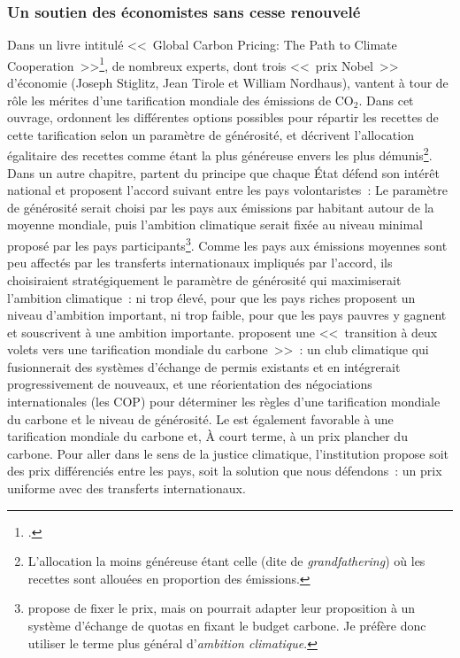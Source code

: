 \documentclass[a5paper,french,openany]{memoir}
\begin{document}
\subsubsection{Un soutien des économistes sans cesse renouvelé}
Dans un livre intitulé <<~Global Carbon Pricing: The Path to Climate Cooperation~>>\footnote{\citet{cramton_global_2017}.}, de nombreux experts, dont trois <<~prix Nobel~>> d'économie (Joseph Stiglitz, Jean Tirole et William Nordhaus), vantent à tour de rôle les mérites d'une tarification mondiale des émissions de CO$_\text{2}$. Dans cet ouvrage, \citet{gollier_negotiating_2015} ordonnent les différentes options possibles pour répartir les recettes de cette tarification selon un paramètre de générosité, et décrivent l'allocation égalitaire des recettes comme étant la plus généreuse envers les plus démunis\footnote{L'allocation la moins généreuse étant celle (dite de \textit{grandfathering}) où les recettes sont allouées en proportion des émissions.}. 
Dans un autre chapitre, \citet{cramton_international_2015} partent du principe que chaque État défend son intérêt national et proposent l'accord suivant entre les pays %
volontaristes~: Le paramètre de générosité serait choisi par les pays aux émissions par habitant autour de la moyenne mondiale, puis l'ambition climatique serait fixée au niveau minimal proposé par les pays participants\footnote{\citet{cramton_international_2015} propose de fixer le prix, mais on pourrait adapter leur proposition à un système d'échange de quotas en fixant le budget carbone. Je préfère donc utiliser le terme plus général d'\textit{ambition climatique}.}. Comme les pays aux émissions moyennes sont peu affectés par les transferts internationaux impliqués par l'accord, ils choisiraient stratégiquement le paramètre de générosité qui maximiserait l'ambition climatique~: ni trop élevé, pour que les pays riches proposent un niveau d'ambition important, ni trop faible, pour que les pays pauvres y gagnent et souscrivent à une ambition importante. \citet{van_den_berg_implications_2020} proposent une <<~transition à deux volets vers une tarification mondiale du carbone~>>~: un club climatique qui fusionnerait des systèmes d'échange de permis existants et en intégrerait progressivement de nouveaux, et une réorientation des négociations internationales (les COP) pour déterminer les règles d'une tarification mondiale du carbone et le niveau de générosité. Le \citet{fmi_how_2019} est également favorable à une tarification mondiale du carbone et, À court terme, à un prix plancher du carbone. Pour aller dans le sens de la justice climatique, l'institution propose soit des prix différenciés entre les pays, soit la solution que nous défendons~: un prix uniforme avec des transferts internationaux. 
\end{document}

